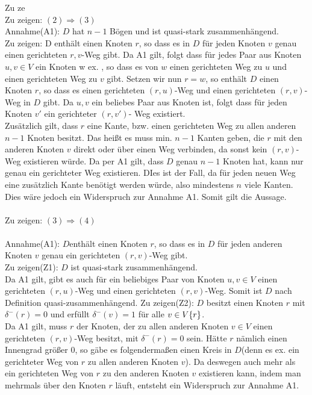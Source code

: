 \documentclass[a4paper,10pt,german]{scrartcl}
\begin{document}
Zu ze
\\
Zu zeigen: $(2) \Rightarrow (3)$\\
Annahme(A1): $D$ hat $n-1$ Bögen und ist quasi-stark zusammenhängend. \\
Zu zeigen: D enthält einen Knoten $r$, so dass es in $D$ für jeden Knoten $v$ genau einen gerichteten $r,v$-Weg gibt.
Da A1 gilt, folgt dass für jedes Paar aus Knoten $u,v \in V$ ein Knoten w ex. , so dass es von $w$ einen gerichteten Weg zu $u$ und einen gerichteten Weg zu $v$ gibt. Setzen wir nun $r = w$, so enthält $D$ einen Knoten $r$, so dass es einen gerichteten $(r,u)$-Weg und einen gerichteten $(r,v)$-Weg in $D$ gibt. Da $u,v$ ein beliebes Paar aus Knoten ist, folgt dass für jeden Knoten $v'$ ein gerichteter $(r,v')$- Weg existiert.\\
Zusätzlich gilt, dass $r$ eine Kante, bzw. einen gerichteten Weg zu allen anderen $n-1$ Knoten besitzt. Das heißt es muss min. $n-1$ Kanten geben, die $r$ mit den anderen Knoten $v$ direkt oder über einen Weg verbinden, da sonst kein $(r,v)$-Weg existieren würde. Da per A1 gilt, dass $D$ genau $n - 1$ Knoten hat, kann nur genau ein gerichteter Weg existieren. DIes ist der Fall, da für jeden neuen Weg eine zusätzlich Kante benötigt werden würde, also mindestens $n$ viele Kanten. Dies wäre jedoch ein Widerspruch zur Annahme A1.
Somit gilt die Aussage.\\
\\
Zu zeigen: $(3) \Rightarrow (4)$\\
\\
Annahme(A1): $D$enthält einen Knoten $r$, so dass es in $D$ für jeden anderen Knoten $v$ genau ein gerichteten $(r,v)$-Weg gibt.\\
Zu zeigen(Z1): $D$ ist quasi-stark zusammenhängend.\\
Da A1 gilt, gibt es auch für ein beliebiges Paar von Knoten $u,v \in V$ einen gerichteten $(r,u)$-Weg und einen gerichteten $(r,v)$-Weg. Somit ist $D$ nach Definition quasi-zusammenhängend. 
Zu zeigen(Z2): $D$ besitzt einen Knoten $r$ mit $\delta^-(r) = 0$ und erfüllt $\delta^-(v) = 1$ für alle $v \in V \\ \{r\}$.\\
Da A1 gilt, muss $r$ der Knoten, der zu allen anderen Knoten $v \in V$ einen gerichteten $(r,v)$-Weg besitzt, mit $\delta^-(r) = 0$ sein. Hätte $r$ nämlich einen Innengrad größer $0$, so gäbe es folgendermaßen einen Kreis in $D$(denn es ex. ein gerichteter Weg von $r$ zu allen anderen Knoten $v$). Da deswegen auch mehr als ein gerichteten Weg von $r$ zu den anderen Knoten $v$ existieren kann, indem man mehrmals über den Knoten $r$ läuft, entsteht ein Widerspruch zur Annahme A1.\\
\end{document}
